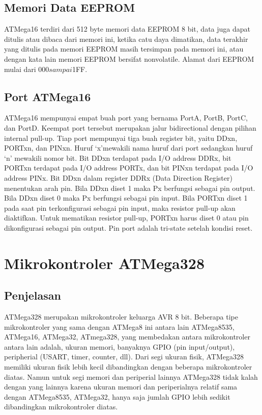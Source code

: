 	\subsection{Memori Data EEPROM}
		ATMega16 terdiri dari 512 byte memori data EEPROM 8 bit, data juga dapat ditulis atau dibaca dari memori ini, ketika catu daya dimatikan, data terakhir yang ditulis pada memori EEPROM masih tersimpan pada memori ini, atau dengan kata lain memori EEPROM bersifat nonvolatile.  Alamat dari EEPROM mulai dari $000 sampai $1FF.
	\subsection{Port ATMega16}
		ATMega16 mempunyai empat buah port yang bernama  PortA, PortB, PortC, dan PortD. Keempat port tersebut merupakan jalur  bidirectional dengan pilihan  internal pull-up. Tiap port mempunyai tiga buah register bit, yaitu DDxn, PORTxn, dan PINxn. Huruf ‘x’mewakili nama huruf dari port sedangkan huruf ‘n’ mewakili nomor bit. Bit DDxn terdapat pada I/O address DDRx, bit PORTxn terdapat pada I/O address PORTx, dan bit PINxn terdapat pada I/O address PINx. Bit DDxn dalam register DDRx (Data Direction Register) menentukan arah pin. Bila DDxn diset 1 maka  Px berfungsi sebagai pin output. Bila DDxn diset 0 maka Px berfungsi sebagai pin input. Bila PORTxn diset 1 pada saat pin terkonfigurasi sebagai pin input, maka resistor pull-up akan diaktifkan. Untuk mematikan resistor  pull-up, PORTxn harus diset 0 atau pin dikonfigurasi sebagai pin output. Pin port adalah  tri-state setelah kondisi reset.

\section{Mikrokontroler ATMega328}
	\subsection{Penjelasan}
	ATMega328 merupakan mikrokontroler keluarga AVR 8 bit. Beberapa tipe mikrokontroler yang sama dengan ATMega8 ini antara lain ATMega8535, ATMega16, ATMega32, ATmega328, yang membedakan antara mikrokontroler antara lain adalah, ukuran memori, banyaknya GPIO (pin input/output), peripherial (USART, timer, counter, dll). Dari segi ukuran fisik, ATMega328 memiliki ukuran fisik lebih kecil dibandingkan dengan beberapa mikrokontroler diatas. Namun untuk segi memori dan periperial lainnya ATMega328 tidak kalah dengan yang lainnya karena ukuran memori dan periperialnya relatif sama dengan ATMega8535, ATMega32, hanya saja jumlah GPIO lebih sedikit dibandingkan mikrokontroler diatas.

